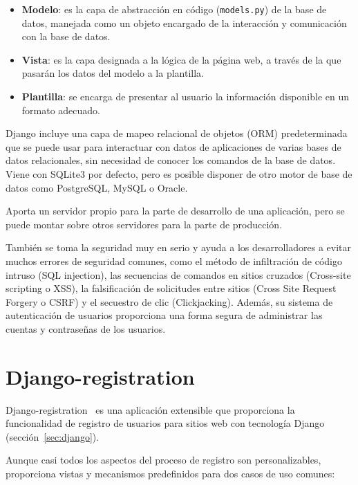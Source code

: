 \documentclass[a4paper, 12pt]{book}
\begin{document}
\begin{itemize}
    \item \textbf{Modelo}: es la capa de abstracción en código (\texttt{models.py}) de la base de datos, manejada como un objeto encargado de la interacción y comunicación con la base de datos.
    \item \textbf{Vista}: es la capa designada a la lógica de la página web, a través de la que pasarán los datos del modelo a la plantilla.
    \item \textbf{Plantilla}: se encarga de presentar al usuario la información disponible en un formato adecuado. 
\end{itemize}

Django incluye una capa de mapeo relacional de objetos (ORM) predeterminada que se puede usar para interactuar con datos de aplicaciones de varias bases de datos relacionales, sin necesidad de conocer los comandos de la base de datos.
Viene con SQLite3 por defecto, pero es posible disponer de otro motor de base de datos como PostgreSQL, MySQL o Oracle.

\vspace{5mm}
Aporta un servidor propio para la parte de desarrollo de una aplicación, pero se puede montar sobre otros servidores para la parte de producción.

\vspace{5mm}
También se toma la seguridad muy en serio y ayuda a los desarrolladores a evitar muchos errores de seguridad comunes, como el método de infiltración de código intruso (SQL injection), las secuencias de comandos en sitios cruzados (Cross-site scripting o XSS), la falsificación de solicitudes entre sitios (Cross Site Request Forgery o CSRF) y el secuestro de clic (Clickjacking).
Además, su sistema de autenticación de usuarios proporciona una forma segura de administrar las cuentas y contraseñas de los usuarios.


\section{Django-registration} 
\label{sec:django-registration}

Django-registration~\cite{Bennett01:django-registration} es una aplicación extensible que proporciona la funcionalidad de registro de usuarios para sitios web con tecnología Django (sección~\ref{sec:django}).

\vspace{5mm}
Aunque casi todos los aspectos del proceso de registro son personalizables, proporciona vistas y mecanismos predefinidos para dos casos de uso comunes:
\end{document}
